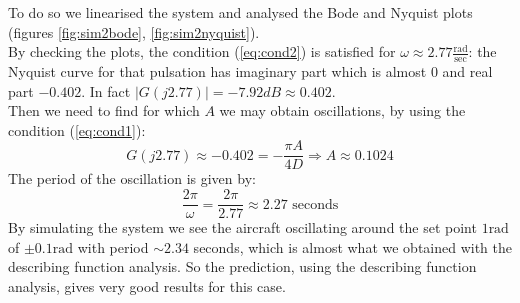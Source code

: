 To do so we linearised the system and analysed the Bode and Nyquist plots (figures \ref{fig:sim2bode}, \ref{fig:sim2nyquist}).\\
By checking the plots, the condition (\ref{eq:cond2}) is satisfied for $\omega \approx 2.77 \frac{\textrm{rad}}{\textrm{sec}}$: the Nyquist curve for that pulsation has imaginary part which is almost 0 and  real part $-0.402$. In fact $|G(j2.77)| = -7.92 dB \approx 0.402$.\\
Then we need to find for which $A$ we may obtain oscillations, by using the condition (\ref{eq:cond1}):
$$ G(j2.77) \approx -0.402 = -\frac{\pi A}{4D} \Rightarrow A \approx 0.1024$$
The period of the oscillation is given by: $$\frac{2\pi}{\omega} = \frac{2\pi}{2.77}\approx 2.27 \textrm{ seconds} $$ By simulating the system we see the aircraft oscillating around the set point $1 \text{rad}$ of $\pm 0.1 \text{rad}$ with period $\sim 2.34$ seconds, which is almost what we obtained with the describing function analysis. So the prediction, using the describing function analysis, gives very good results for this case.
